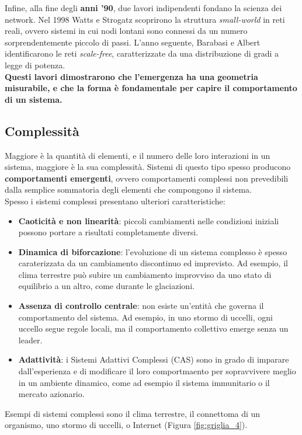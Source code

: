 Infine, alla fine degli \textbf{anni '90}, due lavori indipendenti fondano la scienza dei network. Nel 1998 Watts e Strogatz scoprirono la struttura \textit{small-world} in reti reali, ovvero sistemi in cui nodi lontani sono connessi da un numero sorprendentemente piccolo di passi.
L'anno seguente, Barabasi e Albert identificarono le reti \textit{scale-free}, caratterizzate da una distribuzione di gradi a legge di potenza.\\
\textbf{Questi lavori dimostrarono che l'emergenza ha una geometria misurabile, e che la forma è fondamentale per capire il comportamento di un sistema.}\\


\subsection{Complessità}
Maggiore è la quantità di elementi, e il numero delle loro interazioni in un sistema, maggiore è la sua complessità. Sistemi di questo tipo spesso producono \textbf{comportamenti emergenti}, ovvero comportamenti complessi non prevedibili dalla semplice sommatoria degli elementi che compongono il sistema. \\

Spesso i sistemi complessi presentano ulteriori caratteristiche:\
\begin{itemize}
    \item \textbf{Caoticità e non linearità}: piccoli cambiamenti nelle condizioni iniziali possono portare a risultati completamente diversi.
    \item \textbf{Dinamica di biforcazione}: l'evoluzione di un sistema complesso è spesso caraterizzata da un cambiamento discontinuo ed imprevisto. Ad esempio, il clima terrestre può subire un cambiamento improvviso da uno stato di equilibrio a un altro, come durante le glaciazioni.
    \item \textbf{Assenza di controllo centrale}: non esiste un'entità che governa il comportamento del sistema. Ad esempio, in uno stormo di uccelli, ogni uccello segue regole locali, ma il comportamento collettivo emerge senza un leader.
    \item \textbf{Adattività}: i Sistemi Adattivi Complessi (CAS) sono in grado di imparare dall'esperienza e di modificare il loro comportmaento per sopravvivere meglio in un ambiente dinamico, come ad esempio il sistema immunitario o il mercato azionario.
\end{itemize}

Esempi di sistemi complessi sono il clima terrestre, il connettoma di un organismo, uno stormo di uccelli, o Internet (Figura \ref{fig:griglia_4}).\\

